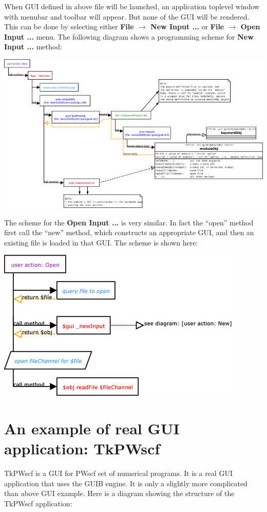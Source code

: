 \documentclass[12pt]{article}
\def\key#1{{\bf #1}}
\begin{document}
When GUI defined in above file will be launched, an application
toplevel window with menubar and toolbar will appear. But none of the
GUI will be rendered. This can be done by selecting either \key{File
  $\rightarrow$ New Input ...} or \key{File $\rightarrow$ Open Input
  ...} menu. The following diagram shows a programming scheme for
\key{New Input ...} method:

\includegraphics[width=1.0\textwidth]{diagrams/GUI-new.png}

The scheme for the \key{Open Input ...} is very similar. In fact the
``open'' method first call the ``new'' method, which constructs an
appropriate GUI, and then an existing file is loaded in that GUI. The
scheme is shown here:

\includegraphics[width=.5\textwidth]{diagrams/GUI-open.png}

\section{An example of real GUI application: TkPWscf}

TkPWscf is a GUI for PWscf set of numerical programs. It is a real GUI
application that uses the GUIB engine. It is only a slightly more
complicated than above GUI example. Here is a diagram showing the
structure of the TkPWscf application:
\end{document}
